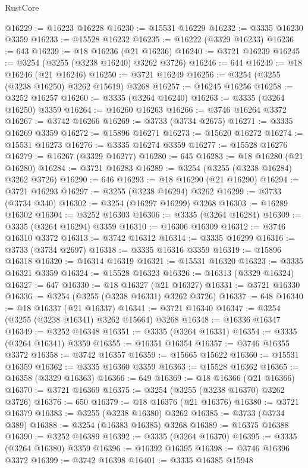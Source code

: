 \begin{lexlean}{RustCore}
\begin{coremodule}
@16229 := @16223 @16228
@16230 := @15531 @16229
@16232 := @3335 @16230 @3359
@16233 := @15528 @16232
@16235 := @16222 (@3329 @16233)
@16236 := 643
@16239 := @18 @16236 (@21 @16236)
@16240 := @3721 @16239
@16245 := @3254 (@3255 (@3238 @16240) @3262 @3726)
@16246 := 644
@16249 := @18 @16246 (@21 @16246)
@16250 := @3721 @16249
@16256 := @3254 (@3255 (@3238 @16250) @3262 @15619) @3268
@16257 := @16245 @16256
@16258 := @3252 @16257
@16260 := @3335 (@3264 @16240)
@16263 := @3335 (@3264 @16250) @3359
@16264 := @16260 @16263
@16266 := @3746 @16264 @3372
@16267 := @3742 @16266
@16269 := @3733 (@3734 @2675)
@16271 := @3335 @16269 @3359
@16272 := @15896 @16271
@16273 := @15620 @16272
@16274 := @15531 @16273
@16276 := @3335 @16274 @3359
@16277 := @15528 @16276
@16279 := @16267 (@3329 @16277)
@16280 := 645
@16283 := @18 @16280 (@21 @16280)
@16284 := @3721 @16283
@16289 := @3254 (@3255 (@3238 @16284) @3262 @3726)
@16290 := 646
@16293 := @18 @16290 (@21 @16290)
@16294 := @3721 @16293
@16297 := @3255 (@3238 @16294) @3262
@16299 := @3733 (@3734 @340)
@16302 := @3254 (@16297 @16299) @3268
@16303 := @16289 @16302
@16304 := @3252 @16303
@16306 := @3335 (@3264 @16284)
@16309 := @3335 (@3264 @16294) @3359
@16310 := @16306 @16309
@16312 := @3746 @16310 @3372
@16313 := @3742 @16312
@16314 := @3335 @16299
@16316 := @3733 (@3734 @2697)
@16318 := @3335 @16316 @3359
@16319 := @15896 @16318
@16320 := @16314 @16319
@16321 := @15531 @16320
@16323 := @3335 @16321 @3359
@16324 := @15528 @16323
@16326 := @16313 (@3329 @16324)
@16327 := 647
@16330 := @18 @16327 (@21 @16327)
@16331 := @3721 @16330
@16336 := @3254 (@3255 (@3238 @16331) @3262 @3726)
@16337 := 648
@16340 := @18 @16337 (@21 @16337)
@16341 := @3721 @16340
@16347 := @3254 (@3255 (@3238 @16341) @3262 @15664) @3268
@16348 := @16336 @16347
@16349 := @3252 @16348
@16351 := @3335 (@3264 @16331)
@16354 := @3335 (@3264 @16341) @3359
@16355 := @16351 @16354
@16357 := @3746 @16355 @3372
@16358 := @3742 @16357
@16359 := @15665 @15622
@16360 := @15531 @16359
@16362 := @3335 @16360 @3359
@16363 := @15528 @16362
@16365 := @16358 (@3329 @16363)
@16366 := 649
@16369 := @18 @16366 (@21 @16366)
@16370 := @3721 @16369
@16375 := @3254 (@3255 (@3238 @16370) @3262 @3726)
@16376 := 650
@16379 := @18 @16376 (@21 @16376)
@16380 := @3721 @16379
@16383 := @3255 (@3238 @16380) @3262
@16385 := @3733 (@3734 @389)
@16388 := @3254 (@16383 @16385) @3268
@16389 := @16375 @16388
@16390 := @3252 @16389
@16392 := @3335 (@3264 @16370)
@16395 := @3335 (@3264 @16380) @3359
@16396 := @16392 @16395
@16398 := @3746 @16396 @3372
@16399 := @3742 @16398
@16401 := @3335 @16385 @15948

\end{coremodule}
\end{lexlean}
